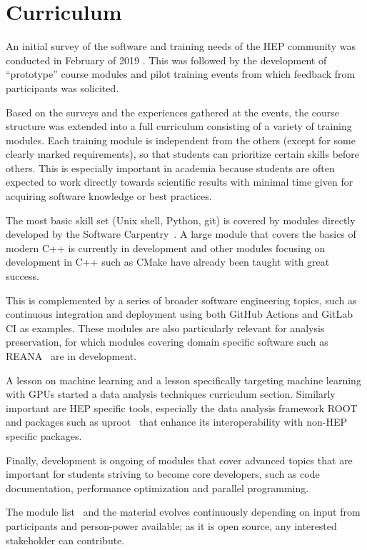 \documentclass[twocolumn]{svjour3}          %
\begin{document}
\section{Curriculum}\label{sec:Curriculum}

An initial survey of the software and training needs of the HEP community was conducted in February of 2019 \cite{david_lange}. This was followed by the development of \enquote{prototype} course modules and  pilot training events from which feedback from participants was solicited.

Based on the surveys and the experiences gathered at the events, the course structure was extended into a full curriculum consisting of a variety of training modules.
Each training module is independent from the others (except for some clearly marked requirements), so that students can prioritize certain skills before others. This is especially important in academia because students are often expected to work directly towards scientific results with minimal time given for acquiring software knowledge or best practices.

The most basic skill set (Unix shell, Python, git) is covered by modules directly developed by the Software Carpentry~\cite{softcarp}. A large module that covers the basics of modern C++ is currently in development and other modules focusing on development in C++ such as CMake have already been taught with great success.

This is complemented by a series of broader software engineering topics, such as continuous integration and deployment using both GitHub Actions and GitLab CI as examples. These modules are also particularly relevant for analysis preservation, for which modules covering domain specific software such as REANA~\cite{reana} are in development.

A lesson on machine learning and a lesson specifically targeting machine learning with GPUs started a data analysis techniques curriculum section. Similarly important are HEP specific tools, especially the data analysis framework ROOT~\cite{root_cern} and packages such as uproot~\cite{uproot} that enhance its interoperability with non-HEP specific packages.

Finally, development is ongoing of modules that cover advanced topics that are important for students striving to become core developers, such as code documentation, performance optimization and parallel programming.

The module list~\cite{HSF-curriculum} and the material evolves continuously depending on input from participants and person-power available; as it is open source, any interested stakeholder can contribute.
\end{document}
